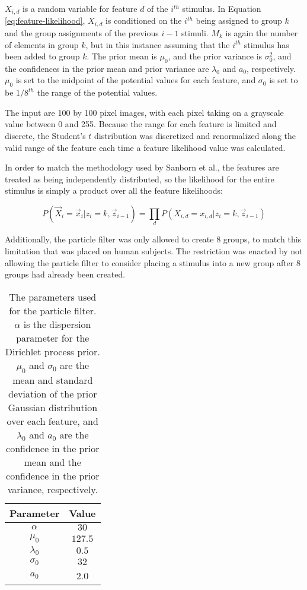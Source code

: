 $X_{i,d}$ is a random variable for feature $d$ of the $i^{th}$ stimulus. In
Equation \ref{eq:feature-likelihood}, $X_{i,d}$ is conditioned on the $i^{th}$
being assigned to group $k$ and the group assignments of the previous $i-1$
stimuli. $M_k$ is again the number of elements in group $k$, but in this
instance assuming that the $i^{th}$ stimulus has been added to group $k$. The
prior mean is $\mu_0$, and the prior variance is $\sigma_0^2$, and the
confidences in the prior mean and prior variance are $\lambda_0$ and $a_0$,
respectively. $\mu_0$ is set to the midpoint of the potential values for each feature,
and $\sigma_0$ is set to be $1/8^{th}$ the range of the potential values.

The input are 100 by 100 pixel images, with each pixel taking on a grayscale
value between 0 and 255. Because the range for each feature is limited and
discrete, the Student's $t$ distribution was discretized and renormalized along
the valid range of the feature each time a feature likelihood value was
calculated.

In order to match the methodology used by Sanborn et al., the features are
treated as being independently distributed, so the likelihood for the entire
stimulus is simply a product over all the feature likelihoods:

\begin{equation}
P(\vec{X}_i = \vec{x}_i | z_i = k,  \vec{z}_{i-1}) =  \prod_d P(X_{i,d} =
x_{i,d} | z_i = k,  \vec{z}_{i-1})
\end{equation}

Additionally, the particle filter was only allowed to create 8 groups, to match
this limitation that was placed on human subjects.  The restriction was enacted
by not allowing the particle filter to consider placing a stimulus into a new
group after 8 groups had already been created.

\begin{table}
\centering
\begin{tabular}{c | c}
Parameter & Value \\ \hline
$\alpha$ & $30$ \\
$\mu_0$ & $127.5$ \\
$\lambda_0$ & $0.5$ \\
$\sigma_0$ & $32$ \\
$a_0$ & 2.0 \\
\end{tabular}
\caption{The parameters used for the particle filter. $\alpha$ is the dispersion
parameter for the Dirichlet process prior. $\mu_0$ and $\sigma_0$ are the mean
and standard deviation of the prior Gaussian distribution over each feature, and
$\lambda_0$ and $a_0$ are the confidence in the prior mean and the confidence in the
prior variance, respectively.}
\label{tab:parameters}
\end{table}
